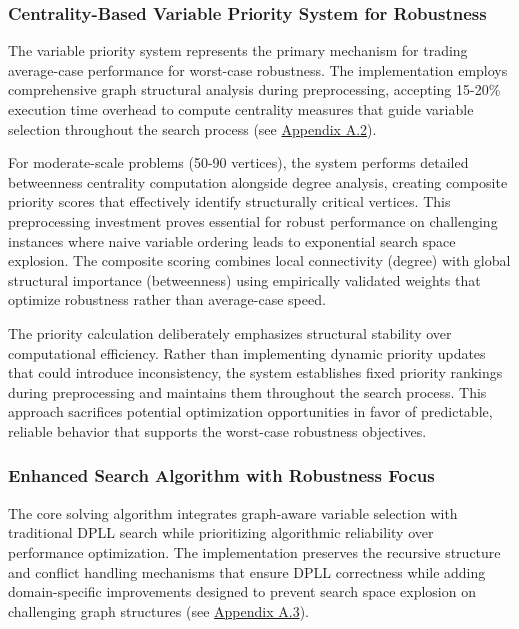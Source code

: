 \subsubsection{Centrality-Based Variable Priority System for Robustness}

The variable priority system represents the primary mechanism for trading average-case performance for worst-case robustness. The implementation employs comprehensive graph structural analysis during preprocessing, accepting 15-20\% execution time overhead to compute centrality measures that guide variable selection throughout the search process (see \hyperref[appendix:centrality-priority]{Appendix A.2}).

For moderate-scale problems (50-90 vertices), the system performs detailed betweenness centrality computation alongside degree analysis, creating composite priority scores that effectively identify structurally critical vertices. This preprocessing investment proves essential for robust performance on challenging instances where naive variable ordering leads to exponential search space explosion. The composite scoring combines local connectivity (degree) with global structural importance (betweenness) using empirically validated weights that optimize robustness rather than average-case speed.

The priority calculation deliberately emphasizes structural stability over computational efficiency. Rather than implementing dynamic priority updates that could introduce inconsistency, the system establishes fixed priority rankings during preprocessing and maintains them throughout the search process. This approach sacrifices potential optimization opportunities in favor of predictable, reliable behavior that supports the worst-case robustness objectives.

\subsubsection{Enhanced Search Algorithm with Robustness Focus}

The core solving algorithm integrates graph-aware variable selection with traditional DPLL search while prioritizing algorithmic reliability over performance optimization. The implementation preserves the recursive structure and conflict handling mechanisms that ensure DPLL correctness while adding domain-specific improvements designed to prevent search space explosion on challenging graph structures (see \hyperref[appendix:graph-aware-search]{Appendix A.3}).

